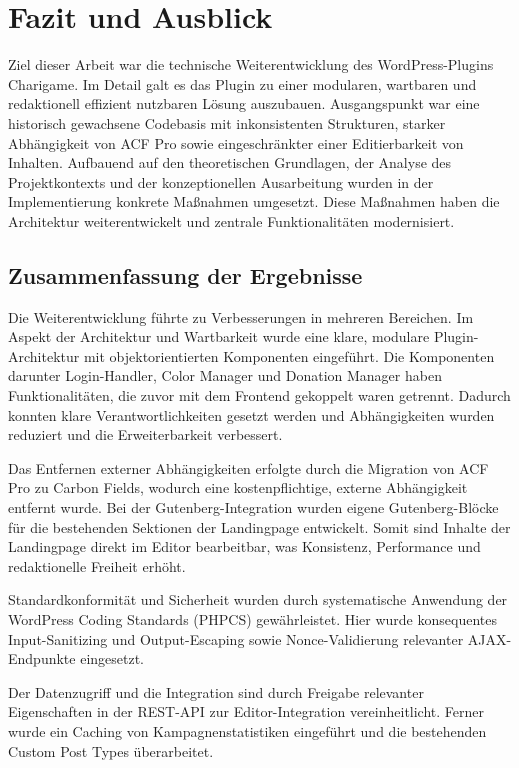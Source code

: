 \chapter{Fazit und Ausblick}
\label{ch:fazit-und-ausblick}

Ziel dieser Arbeit war die technische Weiterentwicklung des WordPress-Plugins Charigame.
Im Detail galt es das Plugin zu einer modularen, wartbaren und redaktionell effizient nutzbaren Lösung auszubauen.
Ausgangspunkt war eine historisch gewachsene Codebasis mit inkonsistenten Strukturen, starker Abhängigkeit von ACF Pro sowie eingeschränkter einer Editierbarkeit von Inhalten.
Aufbauend auf den theoretischen Grundlagen, der Analyse des Projektkontexts und der konzeptionellen Ausarbeitung wurden in der Implementierung konkrete Maßnahmen umgesetzt.
Diese Maßnahmen haben die Architektur weiterentwickelt und zentrale Funktionalitäten modernisiert.

\section{Zusammenfassung der Ergebnisse}
Die Weiterentwicklung führte zu Verbesserungen in mehreren Bereichen.
Im Aspekt der Architektur und Wartbarkeit wurde eine klare, modulare Plugin-Architektur mit objektorientierten Komponenten eingeführt.
Die Komponenten darunter Login-Handler, Color Manager und Donation Manager haben Funktionalitäten, die zuvor mit dem Frontend gekoppelt waren getrennt.
Dadurch konnten klare Verantwortlichkeiten gesetzt werden und Abhängigkeiten wurden reduziert und die Erweiterbarkeit verbessert.

Das Entfernen externer Abhängigkeiten erfolgte durch die Migration von ACF Pro zu Carbon Fields, wodurch eine kostenpflichtige, externe Abhängigkeit entfernt wurde.
Bei der Gutenberg-Integration wurden eigene Gutenberg-Blöcke für die bestehenden Sektionen der Landingpage entwickelt.
Somit sind Inhalte der Landingpage direkt im Editor bearbeitbar, was Konsistenz, Performance und redaktionelle Freiheit erhöht.

Standardkonformität und Sicherheit wurden durch systematische Anwendung der WordPress Coding Standards (PHPCS) gewährleistet.
Hier wurde konsequentes Input-Sanitizing und Output-Escaping sowie Nonce-Validierung relevanter AJAX-Endpunkte eingesetzt.

Der Datenzugriff und die Integration sind durch Freigabe relevanter Eigenschaften in der REST-API zur Editor-Integration vereinheitlicht.
Ferner wurde ein Caching von Kampagnenstatistiken eingeführt und die bestehenden Custom Post Types überarbeitet.

